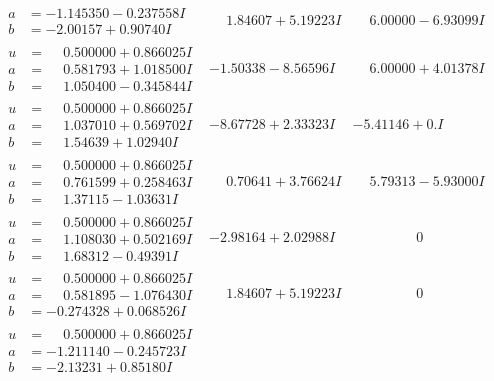 \documentclass[1p]{elsarticle_modified}
\theoremstyle{definition}
\begin{document}
$$\begin{array}{c|c|c}
\begin{aligned}
a &= -1.145350 - 0.237558 I \\
b &= -2.00157 + 0.90740 I\end{aligned}
 & \phantom{-}1.84607 + 5.19223 I & \phantom{-}6.00000 - 6.93099 I \\ \hline\begin{aligned}
u &= \phantom{-}0.500000 + 0.866025 I \\
a &= \phantom{-}0.581793 + 1.018500 I \\
b &= \phantom{-}1.050400 - 0.345844 I\end{aligned}
 & -1.50338 - 8.56596 I & \phantom{-}6.00000 + 4.01378 I \\ \hline\begin{aligned}
u &= \phantom{-}0.500000 + 0.866025 I \\
a &= \phantom{-}1.037010 + 0.569702 I \\
b &= \phantom{-}1.54639 + 1.02940 I\end{aligned}
 & -8.67728 + 2.33323 I & -5.41146 + 0. I\phantom{ +0.000000I} \\ \hline\begin{aligned}
u &= \phantom{-}0.500000 + 0.866025 I \\
a &= \phantom{-}0.761599 + 0.258463 I \\
b &= \phantom{-}1.37115 - 1.03631 I\end{aligned}
 & \phantom{-}0.70641 + 3.76624 I & \phantom{-}5.79313 - 5.93000 I \\ \hline\begin{aligned}
u &= \phantom{-}0.500000 + 0.866025 I \\
a &= \phantom{-}1.108030 + 0.502169 I \\
b &= \phantom{-}1.68312 - 0.49391 I\end{aligned}
 & -2.98164 + 2.02988 I & \phantom{-0.000000 } 0 \\ \hline\begin{aligned}
u &= \phantom{-}0.500000 + 0.866025 I \\
a &= \phantom{-}0.581895 - 1.076430 I \\
b &= -0.274328 + 0.068526 I\end{aligned}
 & \phantom{-}1.84607 + 5.19223 I & \phantom{-0.000000 } 0 \\ \hline\begin{aligned}
u &= \phantom{-}0.500000 + 0.866025 I \\
a &= -1.211140 - 0.245723 I \\
b &= -2.13231 + 0.85180 I\end{aligned}

\end{array}$$
\end{document}
